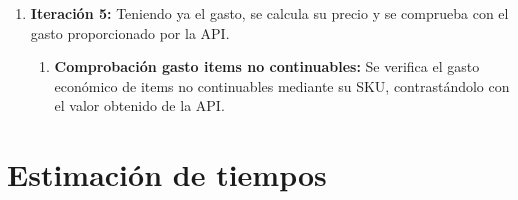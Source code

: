 \begin{enumerate}
\begin{enumerate}
              \item \textbf{Iteración 5:} Teniendo ya el gasto, se calcula su precio y se comprueba con el gasto proporcionado por la API.
                    \setcounter{enumiii}{0} %
                    \begin{enumerate}
                        \item \textbf{Comprobación gasto items no continuables:} Se verifica el gasto económico de items no continuables mediante su SKU, contrastándolo con el valor obtenido de la API.
                    \end{enumerate}
          \end{enumerate}
\end{enumerate}
\newpage

\section{Estimación de tiempos}




